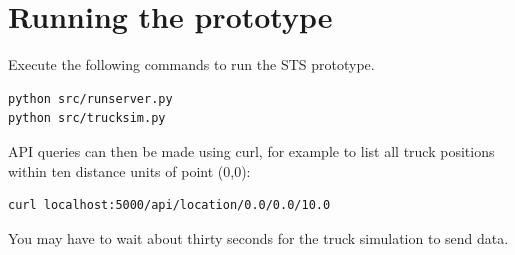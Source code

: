 \documentclass[a4paper,11pt]{report}
\begin{document}
\section{Running the prototype}

Execute the following commands to run the STS prototype.

\begin{verbatim}
python src/runserver.py
python src/trucksim.py
\end{verbatim}

API queries can then be made using curl, for example to list all truck
positions within ten distance units of point (0,0):

\begin{verbatim}
curl localhost:5000/api/location/0.0/0.0/10.0
\end{verbatim}

You may have to wait about thirty seconds for the truck simulation to
send data.

% 
% 


\end{document}
